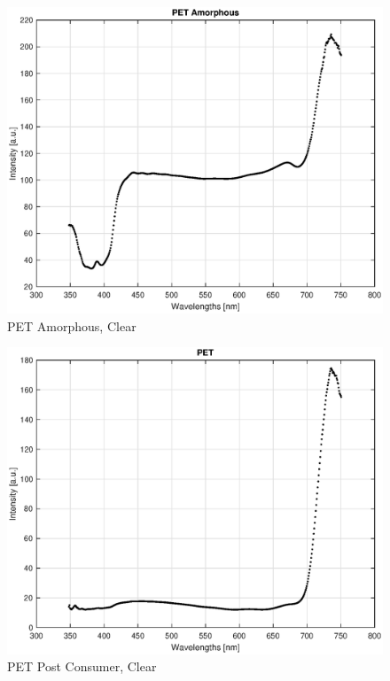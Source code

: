 \begin{appendices}
\begin{figure}
    \centering
    \includegraphics[width = 12cm]{Images/appendix/pet-amorphous-pristine-clear.eps}
    \caption[$\; \:$PET Amorphous]{PET Amorphous, Clear}
    \label{fig:pet}
\end{figure}

\begin{figure}
    \centering
    \includegraphics[width = 12cm]{Images/appendix/pet-postconsum.eps}
    \caption[$\; \:$PET Post Consumer]{PET Post Consumer, Clear}
    \label{fig:pet-pc}
\end{figure}


\end{appendices}

